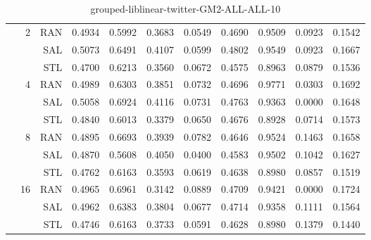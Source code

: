 \begin{center}
\begin{table}[htbp]
\begin{center}
\begin{tabular}{ | r | r | r | r | r | r | r | r | r | r | r |}
 & \multirow{3}{*}{2} & RAN & 0.4934 & 0.5992 & 0.3683 & 0.0549 & 0.4690 & 0.9509 & 0.0923 & 0.1542\\ \cline{3-11}
 &   & SAL & 0.5073 & 0.6491 & 0.4107 & 0.0599 & 0.4802 & 0.9549 & 0.0923 & 0.1667\\ \cline{3-11}
 &   & STL & 0.4700 & 0.6213 & 0.3560 & 0.0672 & 0.4575 & 0.8963 & 0.0879 & 0.1536\\ \cline{2-11}
 & \multirow{3}{*}{4} & RAN & 0.4989 & 0.6303 & 0.3851 & 0.0732 & 0.4696 & 0.9771 & 0.0303 & 0.1692\\ \cline{3-11}
 &   & SAL & 0.5058 & 0.6924 & 0.4116 & 0.0731 & 0.4763 & 0.9363 & 0.0000 & 0.1648\\ \cline{3-11}
 &   & STL & 0.4840 & 0.6013 & 0.3379 & 0.0650 & 0.4676 & 0.8928 & 0.0714 & 0.1573\\ \cline{2-11}
 & \multirow{3}{*}{8} & RAN & 0.4895 & 0.6693 & 0.3939 & 0.0782 & 0.4646 & 0.9524 & 0.1463 & 0.1658\\ \cline{3-11}
 &   & SAL & 0.4870 & 0.5608 & 0.4050 & 0.0400 & 0.4583 & 0.9502 & 0.1042 & 0.1627\\ \cline{3-11}
 &   & STL & 0.4762 & 0.6163 & 0.3593 & 0.0619 & 0.4638 & 0.8980 & 0.0857 & 0.1519\\ \cline{2-11}
 & \multirow{3}{*}{16} & RAN & 0.4965 & 0.6961 & 0.3142 & 0.0889 & 0.4709 & 0.9421 & 0.0000 & 0.1724\\ \cline{3-11}
 &   & SAL & 0.4962 & 0.6383 & 0.3804 & 0.0677 & 0.4714 & 0.9358 & 0.1111 & 0.1564\\ \cline{3-11}
 &   & STL & 0.4746 & 0.6163 & 0.3733 & 0.0591 & 0.4628 & 0.8980 & 0.1379 & 0.1440\\ \cline{2-11}
\hline
\end{tabular}
\caption{grouped-liblinear-twitter-GM2-ALL-ALL-10}
\end{center}
 \end{table}
\end{center}

